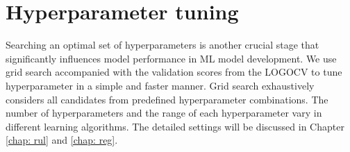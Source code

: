 \section{Hyperparameter tuning}
Searching an optimal set of hyperparameters is another crucial stage that significantly influences model performance in ML model development. We use grid search accompanied with the validation scores from the LOGOCV to tune hyperparameter in a simple and faster manner. Grid search exhaustively considers all candidates from predefined hyperparameter combinations. The number of hyperparameters and the range of each hyperparameter vary in different learning algorithms. The detailed settings will be discussed in Chapter \ref{chap: rul} and \ref{chap: reg}.